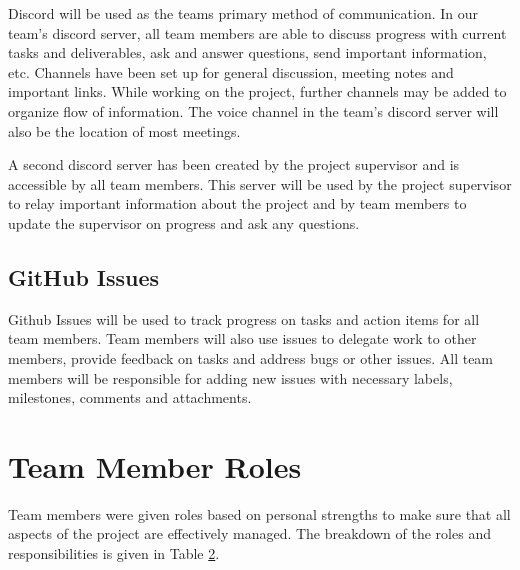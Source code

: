 \documentclass{article}
\begin{document}
Discord will be used as the teams primary method of communication. In our team's discord server, all team members are able to discuss progress with current tasks and deliverables, ask and answer questions, send important information, etc. Channels have been set up for general discussion, meeting notes and important links. While working on the project, further channels may be added to organize flow of information. The voice channel in the team's discord server will also be the location of most meetings.

A second discord server has been created by the project supervisor and is accessible by all team members. This server will be used by the project supervisor to relay important information about the project and by team members to update the supervisor on progress and ask any questions.

\subsection{GitHub Issues}

Github Issues will be used to track progress on tasks and action items for all team members. Team members will also use issues to delegate work to other members, provide feedback on tasks and address bugs or other issues. All team members will be responsible for adding new issues with necessary labels, milestones, comments and attachments.

\section{Team Member Roles}

Team members were given roles based on personal strengths to make sure that all aspects of the project are effectively managed. The breakdown of the roles and responsibilities is given in Table \hyperref[tab:teamRoles]{2}.
\end{document}
